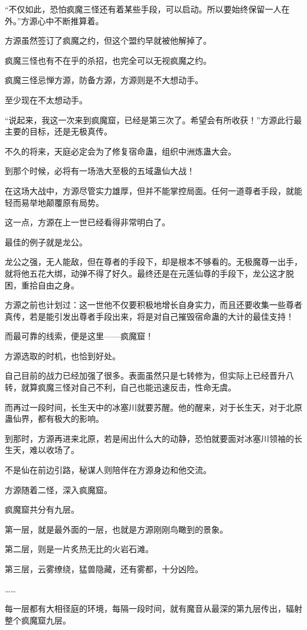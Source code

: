 \begin{this_body}
“不仅如此，恐怕疯魔三怪还有着某些手段，可以启动。所以要始终保留一人在外。”方源心中不断推算着。

方源虽然签订了疯魔之约，但这个盟约早就被他解掉了。

疯魔三怪也有不在乎的杀招，也完全可以无视疯魔之约。

疯魔三怪忌惮方源，防备方源，方源则是不大想动手。

至少现在不太想动手。

“说起来，我这一次来到疯魔窟，已经是第三次了。希望会有所收获！”方源此行最主要的目标，还是无极真传。

不久的将来，天庭必定会为了修复宿命蛊，组织中洲炼蛊大会。

到那个时候，必将有一场浩大至极的五域蛊仙大战！

在这场大战中，方源尽管实力雄厚，但并不能掌控局面。任何一道尊者手段，就能轻而易举地颠覆原有局势。

这一点，方源在上一世已经看得非常明白了。

最佳的例子就是龙公。

龙公之强，无人能敌，但在尊者的手段下，却是根本不够看的。无极魔尊一出手，就将他五花大绑，动弹不得了好久。最终还是在元莲仙尊的手段下，龙公这才脱困，重拾自由之身。

方源之前也计划过：这一世他不仅要积极地增长自身实力，而且还要收集一些尊者真传，若是能引发出尊者手段出来，将是对自己摧毁宿命蛊的大计的最佳支持！

而最可靠的线索，便是这里——疯魔窟！

方源选取的时机，也恰到好处。

自己目前的战力已经加强了很多。表面虽然只是七转修为，但实际上已经晋升八转，就算疯魔三怪对自己不利，自己也能迅速反击，性命无虞。

而再过一段时间，长生天中的冰塞川就要苏醒。他的醒来，对于长生天，对于北原蛊仙界，都有极大的影响。

到那时，方源再进来北原，若是闹出什么大的动静，恐怕就要面对冰塞川领袖的长生天，难以收场了。

不是仙在前边引路，秘谋人则陪伴在方源身边和他交流。

方源随着二怪，深入疯魔窟。

疯魔窟共分有九层。

第一层，就是最外面的一层，也就是方源刚刚鸟瞰到的景象。

第二层，则是一片炙热无比的火岩石滩。

第三层，云雾缭绕，猛兽隐藏，还有雾都，十分凶险。

……

每一层都有大相径庭的环境，每隔一段时间，就有魔音从最深的第九层传出，辐射整个疯魔窟九层。


\end{this_body}
